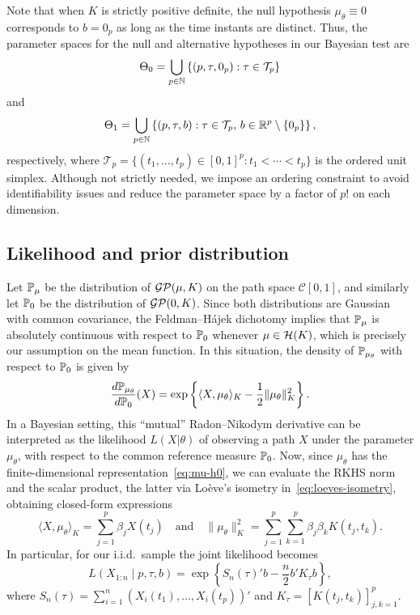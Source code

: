 Note that when \(K\) is strictly positive definite, the null hypothesis \(\mu_\theta\equiv 0\) corresponds to \(b=0_p\) as long as the time instants are distinct. Thus, the parameter spaces for the null and alternative hypotheses in our Bayesian test are
\[
\Theta_0=\bigcup_{p\in\mathbb{N}}\left\{(p, \tau, 0_p): \tau \in \mathcal T_p\right\}
\]
and
\[
  \Theta_1=\bigcup_{p\in\mathbb{N}}\left\{(p, \tau, b): \tau \in \mathcal T_p,\, b \in \mathbb{R}^p\setminus \{0_p\}\right\},
\]
respectively, where \(\mathcal T_p = \{(t_1,\dots,t_p)\in [0,1]^p: t_1 < \cdots < t_p\}\) is the ordered unit simplex. Although not strictly needed, we impose an ordering constraint to avoid identifiability issues and reduce the parameter space by a factor of \(p!\) on each dimension.

\subsection{Likelihood and prior distribution} 

Let \(\mathbb{P}_\mu\) be the distribution of \(\operatorname{\mathcal{GP}}(\mu, K)\) on the path space \(\mathcal C[0,1]\), and similarly let \(\mathbb{P}_0\) be the distribution of \(\operatorname{\mathcal{GP}}(0, K)\). Since both distributions are Gaussian with common covariance, the Feldman--Hájek dichotomy \citep{feldman1958equivalence} implies that \(\mathbb{P}_\mu\) is absolutely continuous with respect to \(\mathbb{P}_0\) whenever \(\mu\in\mathcal{H}(K)\), which is precisely our assumption on the mean function. In this situation, the density of \(\mathbb{P}_{\mu_\theta}\) with respect to \(\mathbb{P}_0\) is given by \citep[Theorem~1]{berrendero2018use}
\begin{equation}\label{eq:rn-derivative}
  \frac{d\mathbb{P}_{\mu_\theta}}{d\mathbb{P}_0}(X) = \exp\left\{\langle X, \mu_\theta\rangle_K - \frac{1}{2}\|\mu_\theta\|^2_K\right\}.
\end{equation}
In a Bayesian setting, this ``mutual'' Radon--Nikodym derivative can be interpreted as the likelihood \(L(X|\theta)\) of observing a path \(X\) under the parameter \(\mu_{\theta}\), with respect to the common reference measure \(\mathbb{P}_0\). Now, since \(\mu_{\theta}\) has the finite-dimensional representation~\eqref{eq:mu-h0}, we can evaluate the \acs{RKHS} norm and the scalar product, the latter via Loève's isometry in~\eqref{eq:loeves-isometry}, obtaining closed-form expressions 
\[
  \langle X, \mu_\theta\rangle_K = \sum_{j=1}^p \beta_j X(t_j)\quad \text{and}\quad \|\mu_\theta\|^2_K = \sum_{j=1}^p \sum_{k=1}^p \beta_j\beta_k K(t_j, t_k).
\] 
In particular, for our i.i.d.\ sample the joint likelihood becomes
\begin{equation}\label{eq:likelihood}
  L(X_{1:n}\mid p, \tau, b) = \exp\left\{S_n(\tau)'b - \frac{n}{2}b' K_{\tau} b\right\},
\end{equation}
where \(S_n(\tau)=\sum_{i=1}^n (X_i(t_1), \dots, X_i(t_p))'\) and \(K_{\tau}=[K(t_j, t_k)]_{j,k=1}^p\). 

